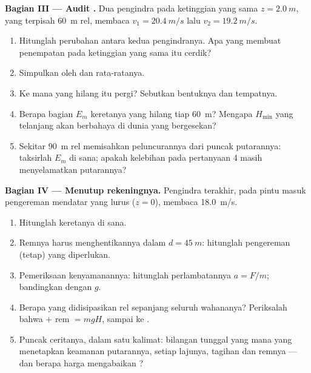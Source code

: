 \begin{problem}
\medskip
\noindent\textbf{Bagian III --- Audit .}
Dua pengindra pada ketinggian yang sama $z = \qty{2.0}{m}$, yang
terpisah \qty{60}{m} rel, membaca $v_1 = \qty{20.4}{m/s}$ lalu
$v_2 = \qty{19.2}{m/s}$.
\begin{enumerate}[resume]
  \item Hitunglah perubahan  antara kedua pengindranya.
        Apa yang membuat penempatan pada ketinggian yang sama itu
        cerdik?
  \item Simpulkan  oleh  dan  rata-ratanya.
  \item Ke mana  yang hilang itu pergi? Sebutkan bentuknya dan
        tempatnya.
  \item Berapa bagian $E_m$ keretanya yang hilang tiap \qty{60}{m}?
        Mengapa $H_{\min}$ yang telanjang akan berbahaya di dunia 
        yang bergesekan?
  \item Sekitar \qty{90}{m} rel memisahkan peluncurannya dari puncak
        putarannya: taksirlah $E_m$ di sana; apakah kelebihan pada
        pertanyaan 4 masih menyelamatkan putarannya?
\end{enumerate}

\medskip
\noindent\textbf{Bagian IV --- Menutup rekeningnya.}
Pengindra terakhir, pada pintu masuk  pengereman mendatar yang
lurus ($z = 0$), membaca \qty{18.0}{m/s}.
\begin{enumerate}[resume]
  \item Hitunglah  keretanya di sana.
  \item Remnya harus menghentikannya dalam $d = \qty{45}{m}$: hitunglah
         pengereman (tetap) yang diperlukan.
  \item Pemeriksaan kenyamanannya: hitunglah perlambatannya $a = F/m$;
        bandingkan dengan $g$.
  \item Berapa  yang didisipasikan  rel sepanjang seluruh
        wahananya? Periksalah bahwa  $+$ rem $= mgH$, sampai ke
        .
  \item Puncak ceritanya, dalam satu kalimat: bilangan tunggal yang mana
        yang menetapkan keamanan putarannya, setiap lajunya, tagihan
         dan  remnya --- dan berapa harga mengabaikan
        ?
\end{enumerate}
\end{problem}
